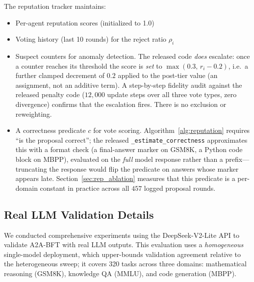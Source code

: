\documentclass{article}
\begin{document}
The reputation tracker maintains:
\begin{itemize}
    \item Per-agent reputation scores (initialized to 1.0)
    \item Voting history (last 10 rounds) for the reject ratio $\rho_i$
    \item Suspect counters for anomaly detection. The released code \emph{does} escalate: once a counter reaches its threshold the score is \emph{set} to $\max(0.3,\, r_i - 0.2)$, i.e.\ a further clamped decrement of $0.2$ applied to the post-tier value (an assignment, not an additive term). A step-by-step fidelity audit against the released penalty code ($12{,}000$ update steps over all three vote types, zero divergence) confirms that the escalation fires. There is no exclusion or reweighting.
    \item A correctness predicate $c$ for vote scoring. Algorithm~\ref{alg:reputation} requires ``is the proposal correct''; the released \texttt{\_estimate\_correctness} approximates this with a format check (a final-answer marker on GSM8K, a Python code block on MBPP), evaluated on the \emph{full} model response rather than a prefix---truncating the response would flip the predicate on answers whose marker appears late. Section~\ref{sec:rep_ablation} measures that this predicate is a per-domain constant in practice across all $457$ logged proposal rounds.
\end{itemize}

\subsection{Real LLM Validation Details}\label{app:realllm}

We conducted comprehensive experiments using the DeepSeek-V2-Lite API to validate A2A-BFT with real LLM outputs. This evaluation uses a \emph{homogeneous} single-model deployment, which upper-bounds validation agreement relative to the heterogeneous sweep; it covers 320 tasks across three domains: mathematical reasoning (GSM8K), knowledge QA (MMLU), and code generation (MBPP).
\end{document}
